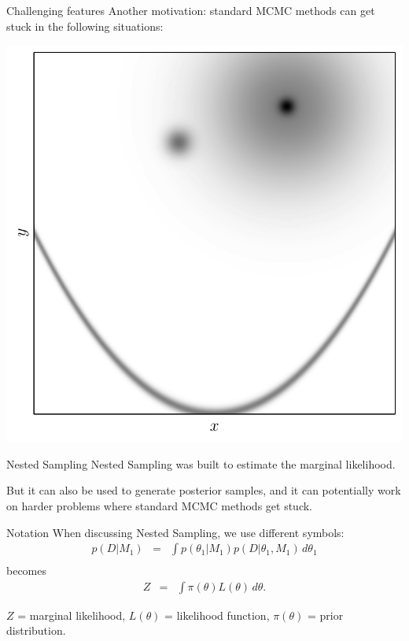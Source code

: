 \documentclass{beamer}
\begin{document}
\begin{frame}[t]{Challenging features}
Another motivation: standard MCMC methods can get stuck in the following
situations:
\begin{center}
\includegraphics[scale=0.4]{figures/challenges.pdf}
\end{center}
\end{frame}

\begin{frame}{Nested Sampling}
Nested Sampling was built to estimate the marginal likelihood.

But it can also be used to generate posterior samples, and it can potentially
work on harder problems where standard MCMC methods get stuck.
\end{frame}

\begin{frame}[t]{Notation}
When discussing Nested Sampling, we use different symbols:
\begin{eqnarray*}
p(D | M_1) &=& \int p(\theta_1 | M_1) p(D | \theta_1, M_1) \, d\theta_1\\
\end{eqnarray*}
becomes
\begin{eqnarray*}
Z &=& \int \pi(\theta) L(\theta) \, d\theta.
\end{eqnarray*}

$Z$ = marginal likelihood, $L(\theta)$ = likelihood function, $\pi(\theta)$ = prior
distribution.
\end{frame}
\end{document}
